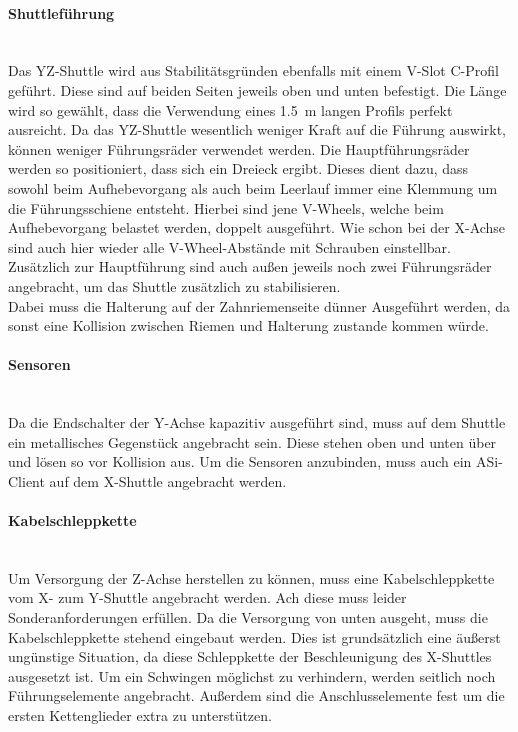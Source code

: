 \paragraph{Shuttleführung}\mbox{}\\
Das YZ-Shuttle wird aus Stabilitätsgründen ebenfalls mit einem V-Slot C-Profil geführt. Diese sind auf beiden Seiten jeweils oben und unten befestigt. Die Länge wird so gewählt, dass die Verwendung eines \SI{1.5}{\meter} langen Profils perfekt ausreicht. Da das YZ-Shuttle wesentlich weniger Kraft auf die Führung auswirkt, können weniger Führungsräder verwendet werden. Die Hauptführungsräder werden so positioniert, dass sich ein Dreieck ergibt. Dieses dient dazu, dass sowohl beim Aufhebevorgang als auch beim Leerlauf immer eine Klemmung um die Führungsschiene entsteht. Hierbei sind jene V-Wheels, welche beim Aufhebevorgang belastet werden, doppelt ausgeführt. Wie schon bei der X-Achse sind auch hier wieder alle V-Wheel-Abstände mit Schrauben einstellbar. Zusätzlich zur Hauptführung sind auch außen jeweils noch zwei Führungsräder angebracht, um das Shuttle zusätzlich zu stabilisieren.\\
Dabei muss die Halterung auf der Zahnriemenseite dünner Ausgeführt werden, da sonst eine Kollision zwischen Riemen und Halterung zustande kommen würde.

\paragraph{Sensoren}\mbox{}\\
Da die Endschalter der Y-Achse kapazitiv ausgeführt sind, muss auf dem Shuttle ein metallisches Gegenstück angebracht sein. Diese stehen oben und unten über und lösen so vor Kollision aus. Um die Sensoren anzubinden, muss auch ein ASi-Client auf dem X-Shuttle angebracht werden.

\paragraph{Kabelschleppkette}\mbox{}\\
Um Versorgung der Z-Achse herstellen zu können, muss eine Kabelschleppkette vom X- zum Y-Shuttle angebracht werden. Ach diese muss leider Sonderanforderungen erfüllen. Da die Versorgung von unten ausgeht, muss die Kabelschleppkette stehend eingebaut werden. Dies ist grundsätzlich eine äußerst ungünstige Situation, da diese Schleppkette der Beschleunigung des X-Shuttles ausgesetzt ist. Um ein Schwingen möglichst zu verhindern, werden seitlich noch Führungselemente angebracht. Außerdem sind die Anschlusselemente fest um die ersten Kettenglieder extra zu unterstützen. \cite{igus_vertikal}

